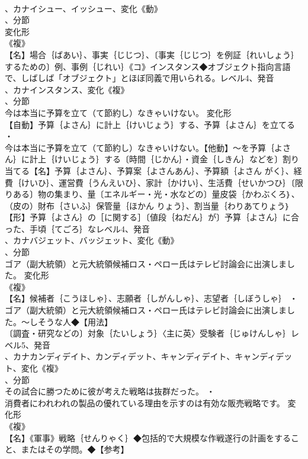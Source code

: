\documentclass[8pt]{extreport}
\begin{document}
\begin{CJK}{UTF8}{min}
\\	、カナイシュー、イッシュー、変化《動》
\\	、分節
\\	変化形 
\\	《複》
\\	【名】場合｛ばあい｝、事実｛じじつ｝、〔事実｛じじつ｝を例証｛れいしょう｝するための〕例、事例｛じれい｝《コ》インスタンス◆オブジェクト指向言語で、しばしば「オブジェクト」とほぼ同義で用いられる。レベル4、発音
\\	、カナインスタンス、変化《複》
\\	、分節
\\	今は本当に予算を立て（て節約し）なきゃいけない。	変化形 
\\	【自動】予算｛よさん｝に計上｛けいじょう｝する、予算｛よさん｝を立てる ・
\\	今は本当に予算を立て（て節約し）なきゃいけない。【他動】～を予算｛よさん｝に計上｛けいじょう｝する〔時間｛じかん｝・資金｛しきん｝などを〕割り当てる【名】予算｛よさん｝、予算案｛よさんあん｝、予算額｛よさん がく｝、経費｛けいひ｝、運営費｛うんえいひ｝、家計｛かけい｝、生活費｛せいかつひ｝〔限りある〕物の集まり、量〔エネルギー・光・水などの〕量皮袋｛かわぶくろ｝、（皮の）財布｛さいふ｝保管量｛ほかん りょう｝、割当量｛わりあてりょう｝【形】予算｛よさん｝の［に関する］〔値段｛ねだん｝が〕予算｛よさん｝に合った、手頃｛てごろ｝なレベル4、発音
\\	、カナバジェット、バッジェット、変化《動》
\\	、分節
\\	ゴア（副大統領）と元大統領候補ロス・ペロー氏はテレビ討論会に出演しました。	変化形 
\\	《複》
\\	【名】候補者｛こうほしゃ｝、志願者｛しがんしゃ｝、志望者｛しぼうしゃ｝ ・
\\	ゴア（副大統領）と元大統領候補ロス・ペロー氏はテレビ討論会に出演しました。～しそうな人◆【用法】
\\	〔調査・研究などの〕対象｛たいしょう｝〈主に英〉受験者｛じゅけんしゃ｝レベル5、発音
\\	、カナカンディデイト、カンディデット、キャンディデイト、キャンディデット、変化《複》
\\	、分節
\\	その試合に勝つために彼が考えた戦略は抜群だった。 ・
\\	消費者にわれわれの製品の優れている理由を示すのは有効な販売戦略です。	変化形 
\\	《複》
\\	【名】《軍事》戦略｛せんりゃく｝◆包括的で大規模な作戦遂行の計画をすること、またはその学問。◆【参考】

\end{CJK}
\end{document}
